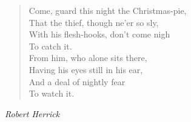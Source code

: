 
\begin{verse}
Come, guard this night the Christmas-pie,\\
That the thief, though ne'er so sly,\\
With his flesh-hooks, don't come nigh\\
\hspace*{10em}To catch it.\\[0.7em]

From him, who alone sits there,\\
Having his eyes still in his ear,\\
And a deal of nightly fear\\
\hspace*{10em}To watch it.%
\end{verse}

\vspace{0.5\baselineskip}
\noindent\textit{Robert Herrick}

\newpage
